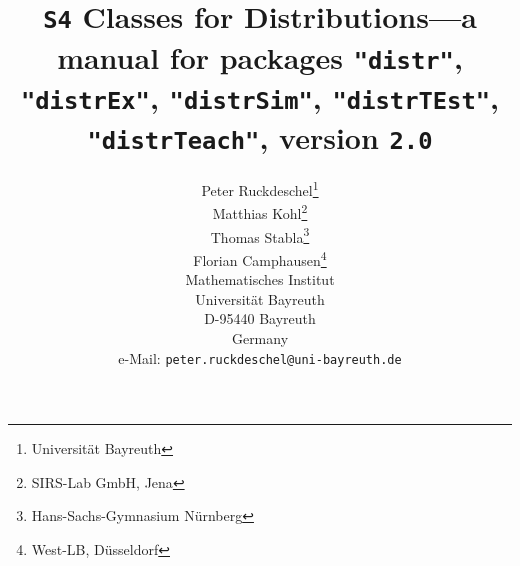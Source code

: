 \documentclass[11pt]{article}
\newcommand{\pkg}[1]{{\tt "#1"}}
\newcommand{\pkgversion}{{\tt 2.0}}
\newcommand{\pkgExversion}{{\tt 2.0}}
\begin{document}
\title{{\tt S4} Classes for Distributions---a manual for packages \pkg{distr}, 
        \pkg{distrEx}, \pkg{distrSim}, \pkg{distrTEst}, \pkg{distrTeach}, 
        version \pkgversion}
\author{\small Peter Ruckdeschel\thanks{Universit\"at Bayreuth}
\\[-.5ex]
\small Matthias Kohl\thanks{SIRS-Lab GmbH, Jena}
\\[-.5ex]
\small Thomas Stabla\thanks{Hans-Sachs-Gymnasium N\"urnberg}
\\[-.5ex]
\small Florian Camphausen\thanks{West-LB, D\"usseldorf}
\smallskip\\
\small Mathematisches Institut\\[-.5ex]
\small Universit\"at Bayreuth\\[-.5ex]
\small D-95440 Bayreuth\\[-.5ex]
\small Germany\\
\small e-Mail: {\small \tt peter.ruckdeschel@uni-bayreuth.de}\\
}
\maketitle
\end{document}
